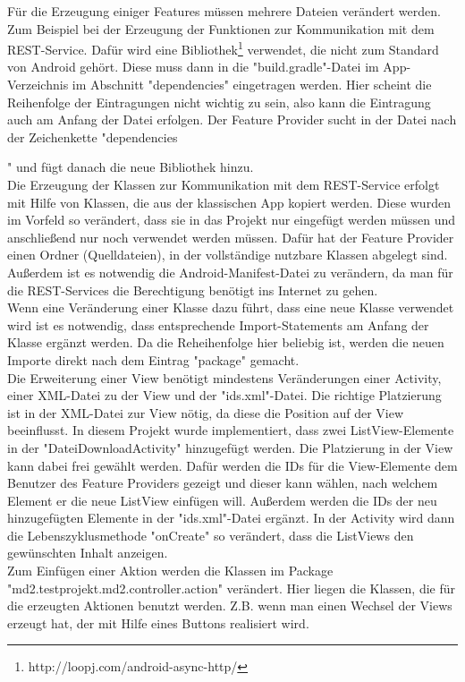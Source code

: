 \documentclass[a4paper,twoside]{article}
\begin{document}
	\noindent F\"ur die Erzeugung einiger Features m\"ussen mehrere Dateien ver\"andert werden. Zum Beispiel bei der Erzeugung der Funktionen zur Kommunikation mit dem REST-Service. Daf\"ur wird eine Bibliothek\footnote{http://loopj.com/android-async-http/} verwendet, die nicht zum Standard von Android geh\"ort. Diese muss dann in die "build.gradle"-Datei im App-Verzeichnis im Abschnitt "dependencies" eingetragen werden. Hier scheint die Reihenfolge der Eintragungen nicht wichtig zu sein, also kann die Eintragung auch am Anfang der Datei erfolgen. Der Feature Provider sucht in der Datei nach der Zeichenkette "dependencies{" und f\"ugt danach die neue Bibliothek hinzu.\\
		Die Erzeugung der Klassen zur Kommunikation mit dem REST-Service erfolgt mit Hilfe von Klassen, die aus der klassischen App kopiert werden. Diese wurden im Vorfeld so ver\"andert, dass sie in das Projekt nur eingef\"ugt werden m\"ussen und anschlie\ss{}end nur noch verwendet werden m\"ussen. Daf\"ur hat der Feature Provider einen Ordner (Quelldateien), in der vollst\"andige nutzbare Klassen abgelegt sind.\\
		Au\ss{}erdem ist es notwendig die Android-Manifest-Datei zu ver\"andern, da man f\"ur die REST-Services die Berechtigung ben\"otigt ins Internet zu gehen.\\
		Wenn eine Ver\"anderung einer Klasse dazu f\"uhrt, dass eine neue Klasse verwendet wird ist es notwendig, dass entsprechende Import-Statements am Anfang der Klasse erg\"anzt werden. Da die Reheihenfolge hier beliebig ist, werden die neuen Importe direkt nach dem Eintrag "package" gemacht.\\
		Die Erweiterung einer View ben\"otigt mindestens Ver\"anderungen einer Activity, einer XML-Datei zu der View und der "ids.xml"-Datei. Die richtige Platzierung ist in der XML-Datei zur View n\"otig, da diese die Position auf der View beeinflusst. In diesem Projekt wurde implementiert, dass zwei ListView-Elemente in der "DateiDownloadActivity" hinzugef\"ugt werden. Die Platzierung in der View kann dabei frei gew\"ahlt werden. Daf\"ur werden die IDs f\"ur die View-Elemente dem Benutzer des Feature Providers gezeigt und dieser kann w\"ahlen, nach welchem Element er die neue ListView einf\"ugen will. Au\ss{}erdem werden die IDs der neu hinzugef\"ugten Elemente in der "ids.xml"-Datei erg\"anzt. In der Activity wird dann die Lebenszyklusmethode "onCreate" so ver\"andert, dass die ListViews den gew\"unschten Inhalt anzeigen.\\
		Zum Einf\"ugen einer Aktion werden die Klassen im Package "md2.testprojekt.md2.controller.action" ver\"andert. Hier liegen die Klassen, die f\"ur die erzeugten Aktionen benutzt werden. Z.B. wenn man einen Wechsel der Views erzeugt hat, der mit Hilfe eines Buttons realisiert wird.
		
}
\end{document}
